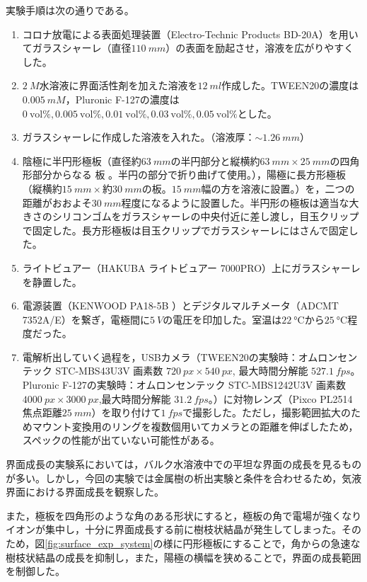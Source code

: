 \documentclass[autodetect-engine,dvi=dvipdfmx,a4paper,ja=standard,oneside,openany,11pt]{bxjsbook}
\begin{document}
実験手順は次の通りである。
\begin{enumerate}
  \item コロナ放電による表面処理装置（Electro-Technic Products BD-20A）を用いてガラスシャーレ（直径$\SI{110}{mm}$）の表面を励起させ，溶液を広がりやすくした。
  \item  {} $\SI{2}{M}$水溶液に界面活性剤を加えた溶液を$\SI{12}{ml}$作成した。TWEEN20の濃度は$\SI{0.005}{mM}$，Pluronic F-127の濃度は$\SI{0}{\mathrm{vol}\%}, \SI{0.005}{\mathrm{vol}\%}, \SI{0.01}{\mathrm{vol}\%}, \SI{0.03}{\mathrm{vol}\%}, \SI{0.05}{\mathrm{vol}\%}$とした。
  \item ガラスシャーレに作成した溶液を入れた。（溶液厚：$\sim\SI{1.26}{mm}$）
  \item 陰極に半円形極板（直径約$\SI{63}{mm}$の半円部分と縦横約$\SI{63}{mm}\times \SI{25}{mm}$の四角形部分からなる 板 。半円の部分で折り曲げて使用。），陽極に長方形極板（縦横約$\SI{15}{mm}\times$約$\SI{30}{mm}$の板。$\SI{15}{mm}$幅の方を溶液に設置。）を，二つの距離がおおよそ$\SI{30}{mm}$程度になるように設置した。半円形の極板は適当な大きさのシリコンゴムをガラスシャーレの中央付近に差し渡し，目玉クリップで固定した。長方形極板は目玉クリップでガラスシャーレにはさんで固定した。
  \item ライトビュアー（HAKUBA ライトビュアー 7000PRO）上にガラスシャーレを静置した。
  \item 電源装置（KENWOOD PA18-5B ）とデジタルマルチメータ（ADCMT 7352A/E）を繋ぎ，電極間に$\SI{5}{V}$の電圧を印加した。室温は$\SI{22}{\degreeCelsius}$から$\SI{25}{\degreeCelsius}$程度だった。
  \item 電解析出していく過程を，USBカメラ（TWEEN20の実験時：オムロンセンテック STC-MBS43U3V 画素数 $\SI{720}{px} \times \SI{540}{px}$, 最大時間分解能 $\SI{527.1}{fps}$。Pluronic F-127の実験時：オムロンセンテック STC-MBS1242U3V 画素数 $\SI{4000}{px} \times \SI{3000}{px}$,最大時間分解能 $\SI{31.2}{fps}$。）に対物レンズ（Pixco PL2514 焦点距離$\SI{25}{mm}$）を取り付けて$\SI{1}{fps}$で撮影した。ただし，撮影範囲拡大のためマウント変換用のリングを複数個用いてカメラとの距離を伸ばしたため，スペックの性能が出ていない可能性がある。
\end{enumerate}

界面成長の実験系においては，バルク水溶液中での平坦な界面の成長を見るものが多い\cite{schilardi1998evolution}。しかし，今回の実験では金属樹の析出実験と条件を合わせるため，気液界面における界面成長を観察した。

また，極板を四角形のような角のある形状にすると，極板の角で電場が強くなりイオンが集中し，十分に界面成長する前に樹枝状結晶が発生してしまった。そのため，図\ref{fig:surface_exp_system}の様に円形極板にすることで，角からの急速な樹枝状結晶の成長を抑制し，また，陽極の横幅を狭めることで，界面の成長範囲を制御した。
\end{document}

